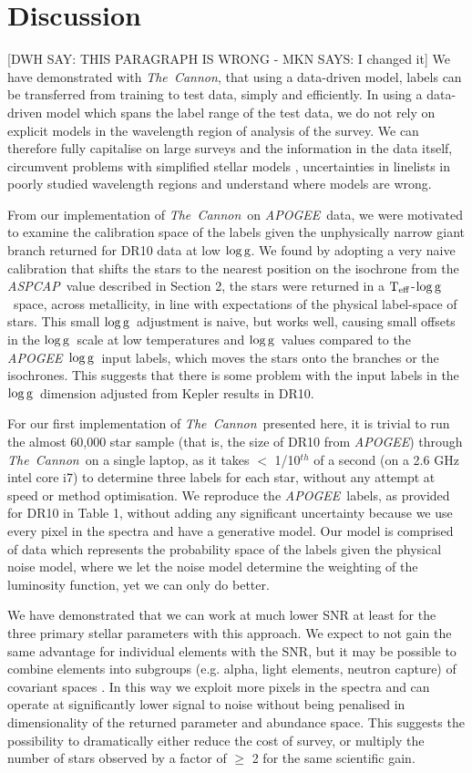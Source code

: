 \documentclass[12pt, preprint]{aastex}
\newcommand{\teff}{\mbox{$\rm T_{eff}$}}
\newcommand{\logg}{\mbox{$\rm \log g$}}
\newcommand{\tc}{\textsl{The~Cannon}}
\newcommand{\apogee}{\textsl{APOGEE}}
\newcommand{\aspcap}{\textsl{ASPCAP}}
\begin{document}
\section{Discussion}

[DWH SAY: THIS PARAGRAPH IS WRONG - MKN SAYS: I changed it] We have demonstrated with \tc,  that using a data-driven model, labels can be transferred from training to test data, simply and efficiently. 
In using a data-driven model which spans the label range of the test data, we do not rely on explicit models in the wavelength region of analysis of the survey. 
We can therefore fully capitalise on large surveys and the information in the data itself, circumvent problems with simplified stellar models , uncertainties in linelists in poorly studied wavelength regions and understand where models are wrong.  

From our implementation of \tc\ on \apogee\ data, we were motivated to examine the calibration space of the labels given the unphysically narrow giant branch returned for DR10 data at low \logg. 
We found by adopting a very naive calibration that shifts the stars to the nearest position on the isochrone from the \aspcap\ value described in Section 2, the stars were returned in a \teff-\logg\ space, across metallicity, in line with expectations of the physical label-space of stars. 
This small \logg\ adjustment is naive, but works well, causing small offsets in the \logg\ scale at low temperatures and \logg\ values compared to the \apogee\ \logg\ input labels, which moves the stars onto the branches or the isochrones. 
This suggests that there is some problem with the input labels in the \logg\ dimension adjusted from Kepler results in DR10. 

For our first implementation of \tc\ presented here, it is trivial to run the almost 60,000 star sample (that is, the size of DR10 from \apogee) through \tc\ on a single laptop, as it takes $<$ 1/10$^{th}$ of a second (on a 2.6 GHz intel core i7) to determine three labels for each star, without any attempt at speed or method optimisation. 
We reproduce the \apogee\ labels, as provided for DR10 in Table 1, without adding any significant uncertainty because we use every pixel in the spectra and have a generative model. 
Our model is comprised of data which represents the probability space of the labels given the physical noise model,  where we let the noise model determine the weighting of the luminosity function, yet we can only do better. 

We have demonstrated that we can work at much lower SNR at least for the three primary stellar parameters with this approach. 
We expect to not gain the same advantage for individual elements with the SNR, but it may be possible to combine elements into subgroups (e.g. alpha, light elements, neutron capture) of covariant spaces \citep[e.g.][]{Ting2012}. In this way we exploit more pixels in the spectra and can operate at significantly lower signal to noise without being penalised in dimensionality of the returned parameter and abundance space. 
This suggests the possibility to dramatically either reduce the cost of survey, or multiply the number of stars observed by a factor of $\ge$ 2 for the same scientific gain. 
\end{document}
